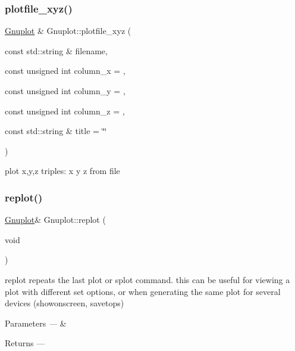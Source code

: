 \subsubsection{\texorpdfstring{plotfile\+\_\+xyz()}{plotfile\_xyz()}}
{\footnotesize\ttfamily \hyperlink{class_gnuplot}{Gnuplot} \& Gnuplot\+::plotfile\+\_\+xyz (\begin{DoxyParamCaption}\item[{const std\+::string \&}]{filename,  }\item[{const unsigned int}]{column\+\_\+x = {},  }\item[{const unsigned int}]{column\+\_\+y = {},  }\item[{const unsigned int}]{column\+\_\+z = {},  }\item[{const std\+::string \&}]{title = {\ttfamily \char`\"{}\char`\"{}} }\end{DoxyParamCaption})}

plot x,y,z triples\+: x y z from file \mbox{\label{class_gnuplot_a34c1b3e877d246a841a29f857a29f502}} 
\subsubsection{\texorpdfstring{replot()}{replot()}}
{\footnotesize\ttfamily \hyperlink{class_gnuplot}{Gnuplot}\& Gnuplot\+::replot (\begin{DoxyParamCaption}\item[{void}]{ }\end{DoxyParamCaption})\hspace{0.3cm}{\ttfamily [inline]}}



replot repeats the last plot or splot command. this can be useful for viewing a plot with different set options, or when generating the same plot for several devices (showonscreen, savetops) 


\begin{DoxyParams}{Parameters}
{\em ---} & \\
\hline
\end{DoxyParams}
\begin{DoxyReturn}{Returns}
--- 
\end{DoxyReturn}
\mbox{\label{class_gnuplot_af845efc728a90d7e10de764eff0b2423}} 
